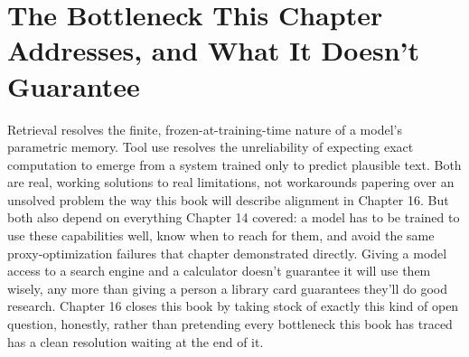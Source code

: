 \section*{The Bottleneck This Chapter Addresses, and What It Doesn't Guarantee}

Retrieval resolves the finite, frozen-at-training-time nature of a model's parametric memory. Tool use resolves the unreliability of expecting exact computation to emerge from a system trained only to predict plausible text. Both are real, working solutions to real limitations, not workarounds papering over an unsolved problem the way this book will describe alignment in Chapter 16. But both also depend on everything Chapter 14 covered: a model has to be trained to use these capabilities well, know when to reach for them, and avoid the same proxy-optimization failures that chapter demonstrated directly. Giving a model access to a search engine and a calculator doesn't guarantee it will use them wisely, any more than giving a person a library card guarantees they'll do good research. Chapter 16 closes this book by taking stock of exactly this kind of open question, honestly, rather than pretending every bottleneck this book has traced has a clean resolution waiting at the end of it.
